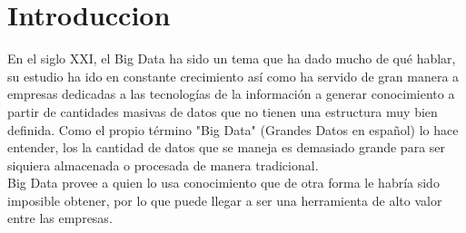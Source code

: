 \section{Introduccion}
En el siglo XXI, el Big Data ha sido un tema que ha dado mucho de qué hablar, su estudio ha ido en constante crecimiento así como ha servido de gran manera a empresas dedicadas a las tecnologías de la información a generar conocimiento a partir de cantidades masivas de datos que no tienen una estructura muy bien definida. Como el propio término "Big Data" (Grandes Datos en español) lo hace entender, los la cantidad de datos que se maneja es demasiado grande para ser siquiera almacenada o procesada de manera tradicional. 
\\
Big Data provee a quien lo usa conocimiento que de otra forma le habría sido imposible obtener, por lo que puede llegar a ser una herramienta de alto valor entre las empresas.